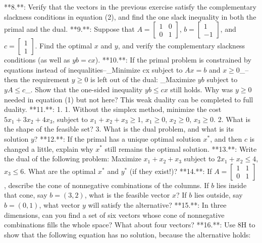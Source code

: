

**8.**: Verify that the vectors in the previous exercise satisfy the complementary slackness conditions in equation (2), and find the one slack inequality in both the primal and the dual.
**9.**: Suppose that \(A=\left[\begin{smallmatrix}1&0\\ 0&1\end{smallmatrix}\right]\), \(b=\left[\begin{smallmatrix}1\\ -1\end{smallmatrix}\right]\), and \(c=\left[\begin{smallmatrix}1\\ 1\end{smallmatrix}\right]\). Find the optimal \(x\) and \(y\), and verify the complementary slackness conditions (as well as \(yb=cx\)).
**10.**: If the primal problem is constrained by equations instead of inequalities--_Minimize cx subject to \(Ax=b\) and \(x\geq 0\)_--then the requirement \(y\geq 0\) is left out of the dual: _Maximize \(yb\) subject to \(yA\leq c\)_. Show that the one-sided inequality \(yb\leq cx\) still holds. Why was \(y\geq 0\) needed in equation (1) but not here? This weak duality can be completed to full duality.
**11.**:
1. 1. Without the simplex method, minimize the cost \(5x_{1}+3x_{2}+4x_{3}\), subject to \(x_{1}+x_{2}+x_{3}\geq 1\), \(x_{1}\geq 0\), \(x_{2}\geq 0\), \(x_{3}\geq 0\).
2. What is the shape of the feasible set?
3. What is the dual problem, and what is its solution \(y\)?
**12.**: If the primal has a unique optimal solution \(x^{*}\), and then \(c\) is changed a little, explain why \(x^{*}\) still remains the optimal solution.
**13.**: Write the dual of the following problem: Maximize \(x_{1}+x_{2}+x_{3}\) subject to \(2x_{1}+x_{2}\leq 4\), \(x_{3}\leq 6\). What are the optimal \(x^{*}\) and \(y^{*}\) (if they exist!)?
**14.**: If \(A=\left[\begin{smallmatrix}1&1\\ 0&1\end{smallmatrix}\right]\), describe the cone of nonnegative combinations of the columns. If \(b\) lies inside that cone, say \(b=(3,2)\), what is the feasible vector \(x\)? If \(b\) lies outside, say \(b=(0,1)\), what vector \(y\) will satisfy the alternative?
**15.**: In three dimensions, can you find a set of six vectors whose cone of nonnegative combinations fills the whole space? What about four vectors?
**16.**: Use 8H to show that the following equation has no solution, because the alternative holds:

